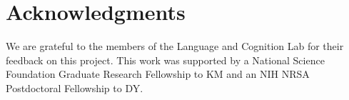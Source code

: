 \documentclass[10pt,letterpaper]{article}
\begin{document}
\section{Acknowledgments}

We are grateful to the members of the Language and Cognition Lab for their feedback on this project. This work was supported by a National Science Foundation Graduate Research Fellowship to KM and an NIH NRSA Postdoctoral Fellowship to DY.




\setlength{\bibleftmargin}{.125in}
\setlength{\bibindent}{-\bibleftmargin}


\end{document}
